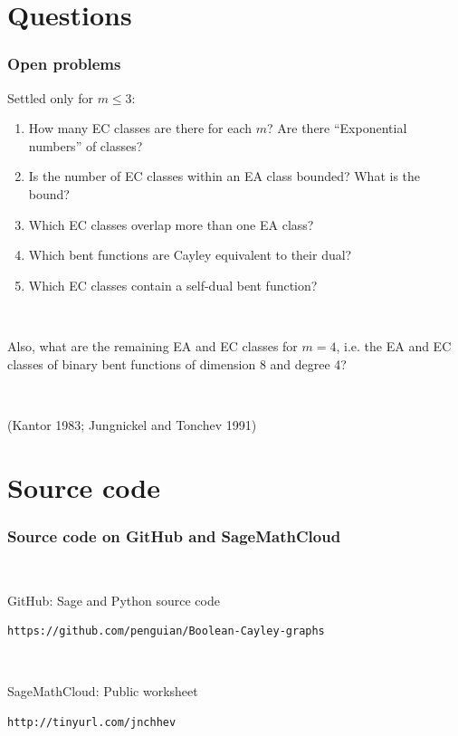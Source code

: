 \documentclass[pdf,sprung,slideColor,nocolorBG]{beamer}
\newcommand{\slidecite}[1]{\tiny{(#1)}\normalsize{}}
\begin{document}
\section{Questions}
\begin{frame}
\frametitle{Open problems}
Settled only for $m \leqslant 3$:
\begin{enumerate}
\item
How many EC classes are there for each $m$? 
Are there ``Exponential numbers'' of classes? 
\item
Is the number of EC classes within an EA class bounded? 
What is the bound?
\item
Which EC classes overlap more than one EA class?
\item
Which bent functions are Cayley equivalent to their dual?
\item
Which EC classes contain a self-dual bent function?
\end{enumerate}
~

Also, what are the remaining EA and EC classes for $m=4$, 
i.e. the EA and EC classes of binary bent functions of dimension 8 and degree 4?

~

\slidecite{Kantor 1983; Jungnickel and Tonchev 1991}
\end{frame}
\section{Source code}
\begin{frame}[fragile]
\frametitle{Source code on GitHub and SageMathCloud}
~

GitHub: Sage and Python source code

\begin{verbatim}
https://github.com/penguian/Boolean-Cayley-graphs
\end{verbatim}

~

SageMathCloud: Public worksheet

\begin{verbatim}
http://tinyurl.com/jnchhev
\end{verbatim}
 
\end{frame}
\end{document}
